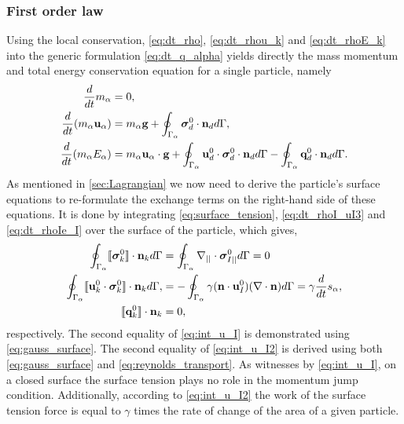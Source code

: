 

\subsubsection{First order law}

Using the local conservation, \ref{eq:dt_rho}, \ref{eq:dt_rhou_k} and \ref{eq:dt_rhoE_k} into the generic formulation \ref{eq:dt_q_alpha} yields directly the mass momentum and total energy conservation equation for a single particle, namely
\begin{align}
    \frac{d}{dt} m_\alpha
    &= 
    0,\\
    \frac{d}{dt} (m_\alpha \textbf{u}_\alpha)
    &= 
    m_\alpha\textbf{g}
    +  \oint_{\Gamma_\alpha} \bm{\sigma}_d^0 \cdot \textbf{n}_d d\Gamma,\\
    \frac{d}{dt} (m_\alpha E_\alpha)
    &= 
    m_\alpha \textbf{u}_\alpha \cdot \textbf{g}
    +\oint_{\Gamma_\alpha} \textbf{u}_d^0 \cdot \bm{\sigma}_d^0 \cdot  \textbf{n}_d d\Gamma 
    - \oint_{\Gamma_\alpha} \textbf{q}_d^0 \cdot \textbf{n}_d d\Gamma. 
\end{align}
As mentioned in \ref{sec:Lagrangian} we now need to derive the particle's surface equations to re-formulate the exchange terms on the right-hand side of these equations. 
It is done by integrating \ref{eq:surface_tension}, \ref{eq:dt_rhoI_uI3} and  \ref{eq:dt_rhoIe_I}  over the surface of the particle, which gives,  
\begin{align}
    \label{eq:int_u_I}
    \oint_{\Gamma_\alpha} \llbracket \bm{\sigma}_k^0 \rrbracket \cdot \textbf{n}_k  d\Gamma
    &=
    \oint_{\Gamma_\alpha} \mathbf{\nabla}_{||}\cdot\bm\sigma^0_{I||} d\Gamma = 0\\
    \label{eq:int_u_I2}
    \oint_{\Gamma_\alpha} \llbracket \textbf{u}_k^0 \cdot \bm{\sigma}_k^0 \rrbracket \cdot \textbf{n}_k d\Gamma,
    &=
    -\oint_{\Gamma_\alpha} \gamma(\textbf{n}\cdot \textbf{u}_{I}^0)(\mathbf{\nabla}\cdot \textbf{n}) d\Gamma
    = \gamma \frac{d}{dt} s_\alpha,\\
    \label{eq:int_q_I}
    \llbracket \textbf{q}_k^0 \rrbracket \cdot \textbf{n}_k
    &=
    0,
\end{align}
respectively. 
The second equality of \ref{eq:int_u_I} is demonstrated using \ref{eq:gauss_surface}. 
The second equality of \ref{eq:int_u_I2} is derived using both \ref{eq:gauss_surface} and \ref{eq:reynolds_transport}. 
As witnesses by \ref{eq:int_u_I}, on a closed surface the surface tension plays no role in the momentum jump condition.
Additionally, according to \ref{eq:int_u_I2} the work of the surface tension force is equal to $\gamma$ times the rate of change of the area of a given particle. 

